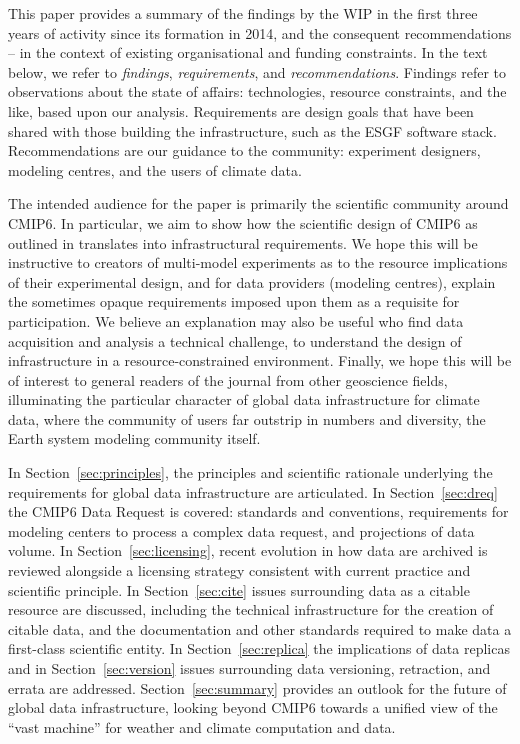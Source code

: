 \documentclass[gmd,manuscript]{copernicus}
\newcommand{\pllabel}[1]{\label{p-#1}\linelabel{l-#1}}
\begin{document}
This paper provides a summary of the findings by the WIP in the first
three years of activity since its formation in 2014, and the
consequent recommendations -- in the context of existing
organisational and funding constraints.
\pllabel{RC1-Overview-2}
In the text below, we refer to \emph{findings}, \emph{requirements},
and \emph{recommendations}. Findings refer to observations about the
state of affairs: technologies, resource constraints, and the like,
based upon our analysis. Requirements are design goals that have been
shared with those building the infrastructure, such as the ESGF
software stack. Recommendations are our guidance to the community:
experiment designers, modeling centres, and the users of climate data.

\pllabel{RC1-Overview-1}
The intended audience for the paper is primarily the scientific
community around CMIP6. In particular, we aim to show how the
scientific design of CMIP6 as outlined in \cite{ref:eyringetal2016a}
translates into infrastructural requirements. We hope this will be
instructive to creators of multi-model experiments as to the resource
implications of their experimental design, and for data providers
(modeling centres), explain the sometimes opaque requirements imposed
upon them as a requisite for participation. We believe an explanation
may also be useful who find data acquisition and analysis a technical
challenge, to understand the design of infrastructure in a
resource-constrained environment. Finally, we hope this will be of
interest to general readers of the journal from other geoscience
fields, illuminating the particular character of global data
infrastructure for climate data, where the community of users far
outstrip in numbers and diversity, the Earth system modeling community
itself.

In Section~\ref{sec:principles}, the principles and scientific
rationale underlying the requirements for global data infrastructure
are articulated. In Section~\ref{sec:dreq} the CMIP6 Data Request is
covered: standards and conventions, requirements for modeling centers
to process a complex data request, and projections of data volume. In
Section~\ref{sec:licensing}, recent evolution in how data are archived
is reviewed alongside a licensing strategy consistent with current
practice and scientific principle. In Section~\ref{sec:cite} issues
surrounding data as a citable resource are discussed, including the
technical infrastructure for the creation of citable data, and the
documentation and other standards required to make data a first-class
scientific entity. In Section~\ref{sec:replica} the implications of
data replicas and in Section~\ref{sec:version} issues surrounding data
versioning, retraction, and errata are addressed.
Section~\ref{sec:summary} provides an outlook for the future of global
data infrastructure, looking beyond CMIP6 towards a unified view of
the ``vast machine'' for weather and climate computation and data.
\end{document}
